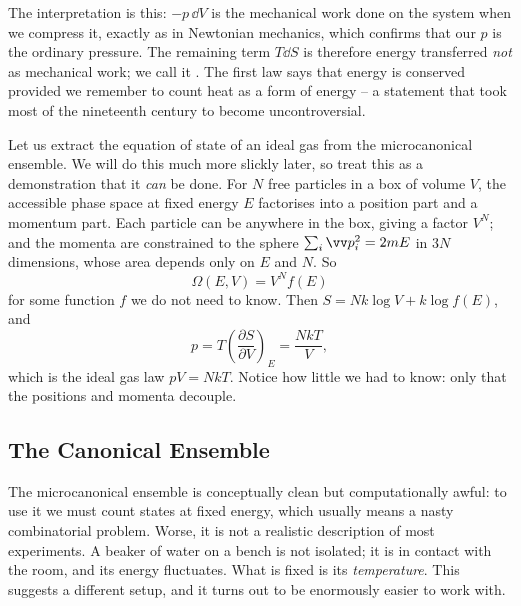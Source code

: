 The interpretation is this: $-p\,\dd V$ is the mechanical work done on the system when we compress it, exactly as in Newtonian mechanics, which confirms that our $p$ is the ordinary pressure. The remaining term $T \dd S$ is therefore energy transferred \emph{not} as mechanical work; we call it . The first law says that energy is conserved provided we remember to count heat as a form of energy -- a statement that took most of the nineteenth century to become uncontroversial.

\begin{example}\label{ex:idealmicro}
	Let us extract the equation of state of an ideal gas from the microcanonical ensemble. We will do this much more slickly later, so treat this as a demonstration that it \emph{can} be done. For $N$ free particles in a box of volume $V$, the accessible phase space at fixed energy $E$ factorises into a position part and a momentum part. Each particle can be anywhere in the box, giving a factor $V^N$; and the momenta are constrained to the sphere $\sum_i \vv p_i^2 = 2mE$ in $3N$ dimensions, whose area depends only on $E$ and $N$. So
	$$
	\Omega(E,V) = V^N f(E)
	$$
	for some function $f$ we do not need to know. Then $S = Nk \log V + k \log f(E)$, and
	$$
	p = T\left(\frac{\partial S}{\partial V}\right)_E = \frac{NkT}{V},
	$$
	which is the ideal gas law $pV = NkT$. Notice how little we had to know: only that the positions and momenta decouple.
\end{example}

\subsection{The Canonical Ensemble}\label{sec:canonical}

The microcanonical ensemble is conceptually clean but computationally awful: to use it we must count states at fixed energy, which usually means a nasty combinatorial problem. Worse, it is not a realistic description of most experiments. A beaker of water on a bench is not isolated; it is in contact with the room, and its energy fluctuates. What is fixed is its \emph{temperature}. This suggests a different setup, and it turns out to be enormously easier to work with.

